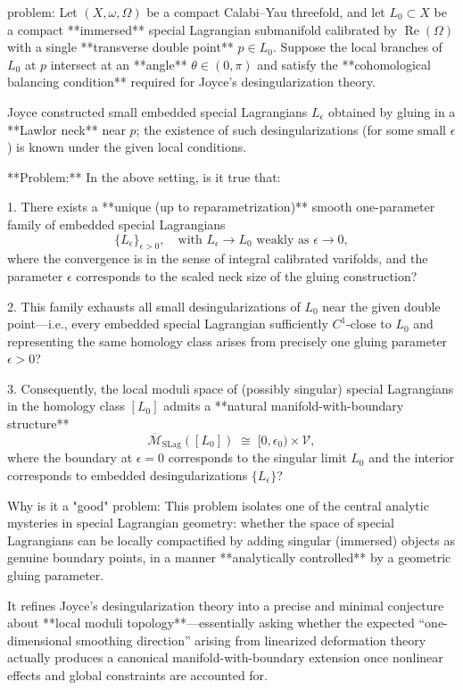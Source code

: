 problem:  
Let \( (X,\omega,\Omega) \) be a compact Calabi–Yau threefold, and let \(L_0 \subset X\) be a compact **immersed** special Lagrangian submanifold calibrated by \(\operatorname{Re}(\Omega)\) with a single **transverse double point** \(p \in L_0\).  Suppose the local branches of \(L_0\) at \(p\) intersect at an **angle** \(\theta \in (0, \pi)\) and satisfy the **cohomological balancing condition** required for Joyce’s desingularization theory.  

Joyce constructed small embedded special Lagrangians \(L_\epsilon\) obtained by gluing in a **Lawlor neck** near \(p\); the existence of such desingularizations (for some small \(\epsilon\)) is known under the given local conditions.  

**Problem:**  
In the above setting, is it true that:  

1. There exists a **unique (up to reparametrization)** smooth one-parameter family of embedded special Lagrangians  
   \[
   \{L_\epsilon\}_{\epsilon>0}, \quad \text{with } L_\epsilon \to L_0 \text{ weakly as } \epsilon \to 0,
   \]
   where the convergence is in the sense of integral calibrated varifolds, and the parameter \(\epsilon\) corresponds to the scaled neck size of the gluing construction?  

2. This family exhausts all small desingularizations of \(L_0\) near the given double point—i.e., every embedded special Lagrangian sufficiently \(C^1\)-close to \(L_0\) and representing the same homology class arises from precisely one gluing parameter \(\epsilon>0\)?  

3. Consequently, the local moduli space of (possibly singular) special Lagrangians in the homology class \([L_0]\) admits a **natural manifold-with-boundary structure**
   \[
   \overline{\mathcal{M}}_{\mathrm{SLag}}([L_0]) \;\cong\; [0,\epsilon_0) \times \mathcal{V},
   \]
   where the boundary at \(\epsilon=0\) corresponds to the singular limit \(L_0\) and the interior corresponds to embedded desingularizations \(\{L_\epsilon\}\)?  

Why is it a "good" problem:  
This problem isolates one of the central analytic mysteries in special Lagrangian geometry: whether the space of special Lagrangians can be locally compactified by adding singular (immersed) objects as genuine boundary points, in a manner **analytically controlled** by a geometric gluing parameter.  

It refines Joyce’s desingularization theory into a precise and minimal conjecture about **local moduli topology**—essentially asking whether the expected “one-dimensional smoothing direction” arising from linearized deformation theory actually produces a canonical manifold-with-boundary extension once nonlinear effects and global constraints are accounted for.  

